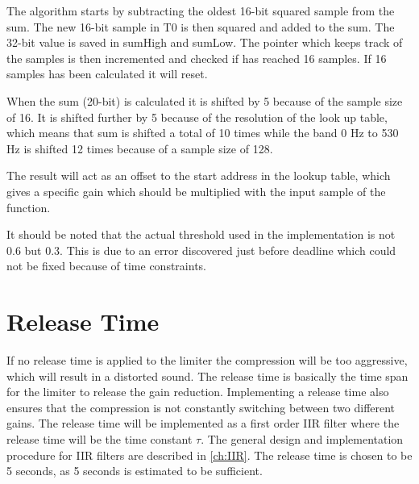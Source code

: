 The algorithm starts by subtracting the oldest 16-bit squared sample from the sum. The new 16-bit sample in T0 is then squared and added to the sum. The 32-bit value is saved in sumHigh and sumLow. The pointer which keeps track of the samples is then incremented and checked if has reached 16 samples. If 16 samples has been calculated it will reset.

When the sum (20-bit) is calculated it is shifted by 5 because of the sample size of 16. It is shifted further by 5 because of the resolution of the look up table, which means that sum is shifted a total of 10 times while the band 0 Hz to 530 Hz is shifted 12 times because of a sample size of 128. 

The result will act as an offset to the start address in the lookup table, which gives a specific gain which should be multiplied with the input sample of the function.

It should be noted that the actual threshold used in the implementation is not 0.6 but 0.3. This is due to an error discovered just before deadline which could not be fixed because of time constraints.



\section{Release Time}

If no release time is applied to the limiter the compression will be too aggressive, which will result in a distorted sound. The release time is basically the time span for the limiter to release the gain reduction. Implementing a release time also ensures that the compression is not constantly switching between two different gains. The release time will be implemented as a first order IIR filter where the release time will be the time constant $\tau$. The general design and implementation procedure for IIR filters are described in \autoref{ch:IIR}. The release time is chosen to be 5 seconds, as 5 seconds is estimated to be sufficient.

